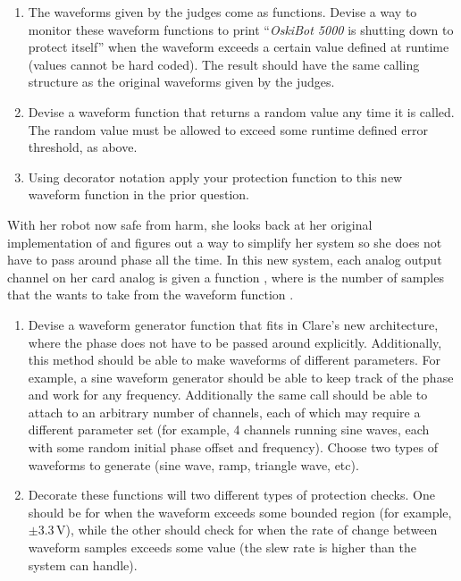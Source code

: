 \documentclass[10pt, letterpaper, acro-macros]{python-problem}
\newcommand{\oski}{\emph{OskiBot 5000}\xspace}
\begin{document}
\begin{enumerate}[resume]
  \item The waveforms given by the judges come as functions. Devise a way to
        monitor these waveform functions to print ``\oski is shutting
        down to protect itself'' when the waveform exceeds a certain value
        defined at runtime (values cannot be hard coded). The result should
        have the same calling structure as the original waveforms given by
        the judges.

  \item Devise a waveform function that returns a random value any time it is
        called. The random value must be allowed to exceed some runtime
        defined error threshold, as above.

  \item Using decorator notation apply your protection function to this
        new waveform function in the prior question.

\end{enumerate}

With her robot now safe from harm, she looks back at her original
implementation of  and figures out a way to simplify her
system so she does not have to pass around phase all the time. In this new
system, each analog output channel on her \daq card analog is given
a function , where  is the
number of samples that the \daq wants to take from the waveform
function .

\begin{enumerate}[resume]
  \item Devise a waveform generator function that fits in Clare's new
        \daq architecture, where the phase does not have to be
        passed around explicitly. Additionally, this method should be able
        to make waveforms of different parameters. For example, a sine
        waveform generator should be able to keep track of the phase and
        work for any frequency. Additionally the same call should be able to
        attach to an arbitrary number of channels, each of which may require
        a different parameter set (for example, 4 channels running sine
        waves, each with some random initial phase offset and frequency).
        Choose two types of waveforms to generate (sine wave, ramp, triangle
        wave, etc).

  \item Decorate these functions will two different types of protection
        checks. One should be for when the waveform exceeds some bounded
        region (for example, $\pm 3.3\,\mathrm{V}$), while the other should
        check for when the rate of change between waveform samples exceeds
        some value (the slew rate is higher than the system can handle).
\end{enumerate}
\end{document}
